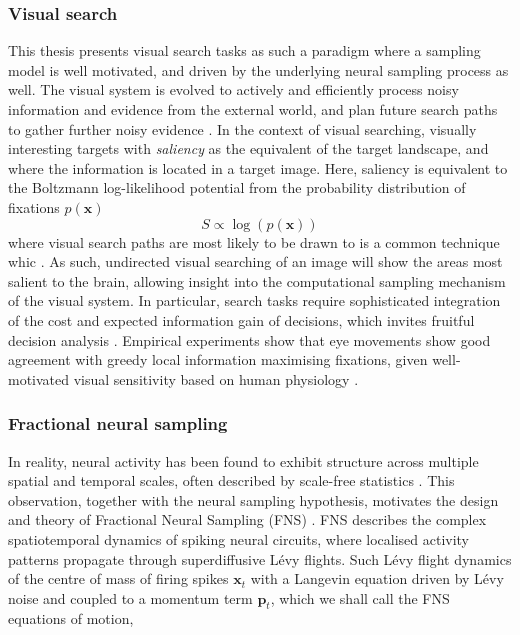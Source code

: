 \subsubsection*{Visual search}
This thesis presents visual search tasks as such a paradigm where a sampling model is well motivated, and driven by the underlying neural sampling process as well. The visual system is evolved to actively and efficiently process noisy information and evidence from the external world, and plan future search paths to gather further noisy evidence \cite{Renninger2005-ee, renninger_where_2007, najemnik_optimal_2005, bujia_modeling_2022}. In the context of visual searching, visually interesting targets with \textit{saliency} as the equivalent of the target landscape, and where the information is located in a target image. Here, saliency is equivalent to the Boltzmann log-likelihood potential from the probability distribution of fixations $p(\textbf{x})$
\begin{equation}
	S \propto \log(p(\textbf{x}))
\end{equation}
where visual search paths are most likely to be drawn to is a common technique whic \cite{Bruce_2009_Saliency}. As such, undirected visual searching of an image will show the areas most salient to the brain, allowing insight into the computational sampling mechanism of the visual system. In particular, search tasks require sophisticated integration of the cost and expected information gain of decisions, which invites fruitful decision analysis \cite{Wedel_2023}. Empirical experiments show that eye movements show good agreement with greedy local information maximising fixations, given well-motivated visual sensitivity based on human physiology \cite{Radulescu_2026, najemnik_optimal_2005, renninger_where_2007}.

\subsubsection*{Fractional neural sampling}

In reality, neural activity has been found to exhibit structure across multiple spatial and temporal scales, often described by scale-free statistics \cite{boonstra_scale-free_2013, he_scale-free_2014, he_temporal_2010, jiao_biologically_2026, jones_scale-free_2023, lin_scale-free_2016, mashour_conscious_2020, roberts_heavy_2015, zhang_heavy-tailed_2025}. This observation, together with the neural sampling hypothesis, motivates the design and theory of Fractional Neural Sampling (FNS) \cite{qi_fractional_2022}. FNS describes the complex spatiotemporal dynamics of spiking neural circuits, where localised activity patterns propagate through superdiffusive Lévy flights. Such Lévy flight dynamics of the centre of mass of firing spikes $\textbf{x}_t$ with a Langevin equation driven by Lévy noise and coupled to a momentum term $\textbf{p}_t$, which we shall call the FNS equations of motion,


